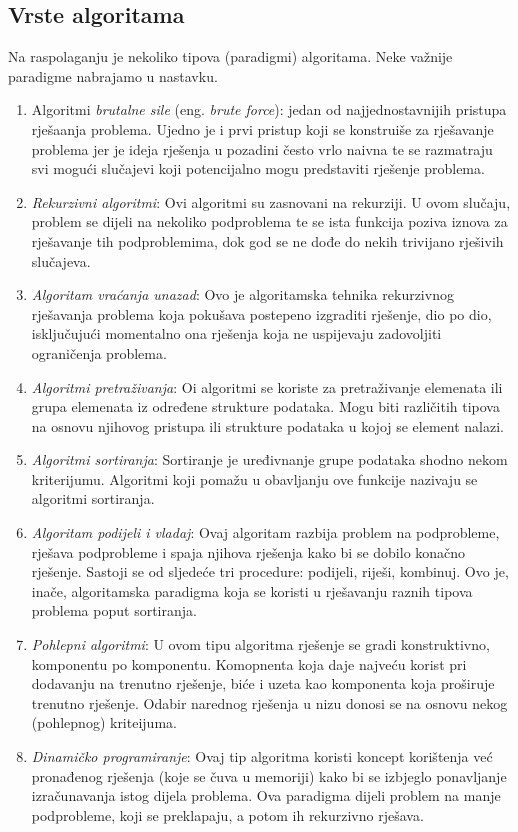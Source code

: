  \subsection{Vrste algoritama}
Na raspolaganju je nekoliko tipova (paradigmi) algoritama. Neke važnije paradigme nabrajamo u nastavku. 
\begin{enumerate}
	\item Algoritmi \textit{brutalne sile} (eng. \textit{brute force}): jedan od najjednostavnijih pristupa rješaanja problema. Ujedno je i prvi pristup koji se konstruiše za  rješavanje problema jer je ideja rješenja u pozadini često vrlo naivna te se razmatraju svi mogući slučajevi koji  potencijalno mogu predstaviti rješenje problema.
	\item \textit{Rekurzivni algoritmi}: Ovi algoritmi su zasnovani na rekurziji. U ovom slučaju, problem se dijeli na nekoliko podproblema te  se ista funkcija poziva iznova za rješavanje tih podproblemima, dok god se ne dođe do nekih trivijano rješivih slučajeva.
	\item \textit{Algoritam vraćanja unazad}: Ovo je algoritamska tehnika rekurzivnog rješavanja problema koja pokušava postepeno izgraditi rješenje, dio po dio, isključujući momentalno ona rješenja koja ne uspijevaju zadovoljiti ograničenja problema. 
	\item  \textit{Algoritmi pretraživanja}:  Oi algoritmi se koriste za pretraživanje elemenata ili grupa elemenata iz određene strukture podataka. Mogu biti različitih tipova na osnovu njihovog pristupa ili strukture podataka u kojoj se element nalazi.
	\item \textit{Algoritmi sortiranja}: Sortiranje je uređivnanje grupe podataka  shodno nekom kriterijumu. Algoritmi koji pomažu u obavljanju ove funkcije nazivaju se algoritmi sortiranja. %
	\item \textit{Algoritam podijeli i vladaj}: Ovaj algoritam razbija problem na podpro\-bleme, rješava podprobleme i spaja njihova rješenja kako bi se dobilo konačno rješenje. Sastoji se od sljedeće tri procedure:
    podijeli, riješi, kombinuj. Ovo je, inače, algoritamska paradigma koja se koristi u rješavanju raznih tipova problema poput sortiranja.
  
    \item \textit{Pohlepni algoritmi}: U ovom tipu algoritma rješenje se gradi konstruktivno, komponentu po komponentu.   Komopnenta koja daje najveću korist pri dodavanju na trenutno rješenje, biće i uzeta kao komponenta koja  proširuje trenutno  rješenje. Odabir  narednog rješenja u nizu donosi se na osnovu nekog (pohlepnog) kriteijuma.
    \item \textit{Dinamičko programiranje}: Ovaj tip algoritma koristi koncept korištenja već pronađenog rješenja (koje se čuva u memoriji) kako bi se izbjeglo ponavljanje izračunavanja istog dijela problema. Ova paradigma dijeli problem na manje podprobleme, koji se preklapaju, a potom ih rekurzivno rješava.
\end{enumerate}
   
